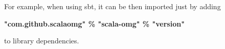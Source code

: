 \bigskip
For example, when using sbt, it can be then imported just by adding 

\begin{center}
\textbf{"com.github.scalaomg" \% "scala-omg" \% "version"}
\end{center}

to library dependencies.































 